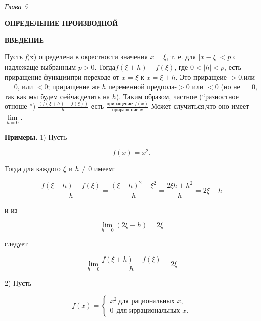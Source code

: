 \documentclass[12pt,cmcyralt]{book} %
\begin{document}
\pagestyle{empty}
\begin{center}
\ 

\vspace{40pt}
{\it Г\hspace{4 pt}л\hspace{4 pt}а\hspace{4 pt}в\hspace{4 pt}а\hspace{4 pt} \hspace{4 pt}5}

\vspace{12pt}
{\large\textbf{ОПРЕДЕЛЕНИЕ ПРОИЗВОДНОЙ}}

\vspace{12pt}
\textbf{ВВЕДЕНИЕ}

\end{center}
Пусть {\it f}(x) определена в окрестности значения $ x = \xi $, \linebreak т. е. для $|x - \xi | < p$ с надлежаще выбранным $p > 0$. Тогда\linebreak $f(\xi + h) - f(\xi)$, где $0 < |h| < p$, есть приращение функции\linebreak при переходе от $x = \xi$ к $x = \xi + h$. Это приращеие $> 0$,\linebreak или $= 0$, или $< 0$; приращение же $h$ переменной предпола- $> 0$ или $< 0$ (но не $= 0$, так как мы будем сейчас\linebreak делить на $h$). Таким образом, частное ("`разностное отноше-"')  $\frac{(f(\xi + h)-f(\xi))}{h}$ есть $\frac{\text{приращение \ } f(x)}{\text{приращение \ }x}$ Может случиться,\linebreak что оно имеет $\lim\limits_{h = 0}$.

\textbf{Примеры.} 1) Пусть

$$f(x) = x^2.$$

\noindent Тогда для каждого $\xi$ и $h \neq 0$ имеем:

$$\frac{f(\xi + h)-f(\xi)}{h} = \frac{(\xi+h)^2-\xi^2}{h}=\frac{2\xi h + h^2}{h}=2\xi + h$$

\noindent и из

$$\lim_{h=0}(2\xi+h) = 2\xi$$

\noindent следует 

$$\lim_{h=0} \frac{f(\xi + h)-f(\xi)}{h} = 2\xi$$

2) Пусть

$$f(x) =
\begin{cases} 
x^2 \  \text{для рациональных $x$,}\\
0 \ \ \text{для иррациональных $x$.}
\end{cases}
$$
\end{document}
